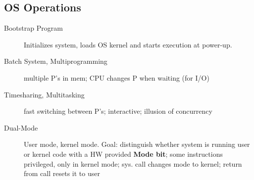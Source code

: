 \subsection*{OS Operations}
\begin{description}
  \item[Bootstrap Program] Initializes system, loads OS kernel and starts execution at power-up.
  \item[Batch System, Multiprogramming] multiple P's in mem; CPU changes P when waiting (for I/O)
  \item[Timesharing, Multitasking]  fast switching between P's; interactive; illusion of concurrency
  \item[Dual-Mode] User mode, kernel mode. Goal: distinguish whether system is running user or kernel code with a HW provided \textbf{Mode bit}; some instructions
privileged, only in kernel mode; sys. call changes mode to kernel; return from call resets it to user
\end{description}
